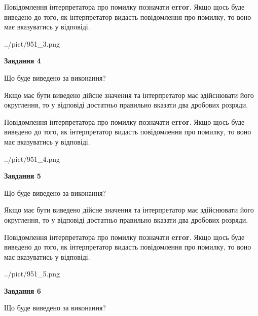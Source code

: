 \documentclass[12pt, ukrainian]{article}
\begin{document}
{\begin {Large}
Повідомлення інтерпретатора про помилку позначати \textbf{error}.
Якщо щось буде виведено до того, як інтерпретатор видасть повідомлення про помилку, 
то воно має вказуватись у відповіді. \par

\begin{center}
	{../pict/951_3.png}
\end{center}
\newpage

{\begin {center}\textbf{Завдання 4}\end {center}}\par
Що буде виведено за виконання? \par

Якщо має бути виведено дійсне значення та інтерпретатор має здійснювати його округлення, 
то у відповіді достатньо правильно вказати два дробових розряди.

Повідомлення інтерпретатора про помилку позначати \textbf{error}.
Якщо щось буде виведено до того, як інтерпретатор видасть повідомлення про помилку, 
то воно має вказуватись у відповіді. \par

\begin{center}
	{../pict/951_4.png}
\end{center}
\newpage

{\begin {center}\textbf{Завдання 5}\end {center}}\par
Що буде виведено за виконання? \par

Якщо має бути виведено дійсне значення та інтерпретатор має здійснювати його округлення, 
то у відповіді достатньо правильно вказати два дробових розряди.

Повідомлення інтерпретатора про помилку позначати \textbf{error}.
Якщо щось буде виведено до того, як інтерпретатор видасть повідомлення про помилку, 
то воно має вказуватись у відповіді. \par

\begin{center}
	{../pict/951_5.png}
\end{center}
\newpage

{\begin {center}\textbf{Завдання 6}\end {center}}\par
Що буде виведено за виконання? \par


\end{Large}}
\end{document}
